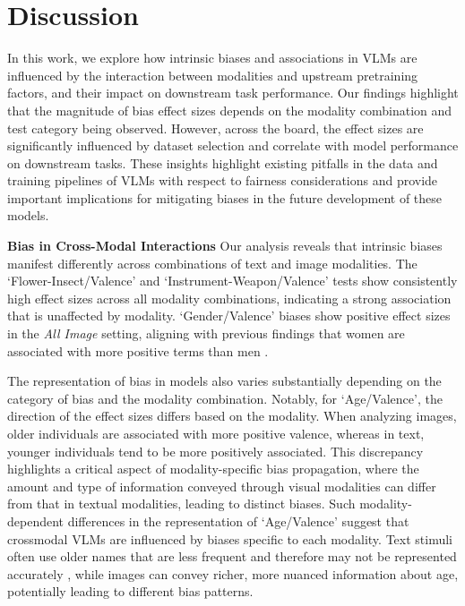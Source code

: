 \section{Discussion}
In this work, we explore how intrinsic biases and associations in VLMs are influenced by the interaction between modalities and upstream pretraining factors, and their impact on downstream task performance. Our findings highlight that the magnitude of bias effect sizes depends on the modality combination and test category being observed. However, across the board, the effect sizes are significantly influenced by dataset selection and correlate with model performance on downstream tasks. These insights highlight existing pitfalls in the data and training pipelines of VLMs with respect to fairness considerations and provide important implications for mitigating biases in the future development of these models.

\noindent\textbf{Bias in Cross-Modal Interactions} Our analysis reveals that intrinsic biases manifest differently across combinations of text and image modalities. The `Flower-Insect/Valence' and `Instrument-Weapon/Valence' tests show consistently high effect sizes across all modality combinations, indicating a strong association that is unaffected by modality. `Gender/Valence' biases show positive effect sizes in the \textit{All Image} setting, aligning with previous findings that women are associated with more positive terms than men \cite{caliskan2022gender, charlesworth2024extracting}. 

The representation of bias in models also varies substantially depending on the category of bias and the modality combination. Notably, for `Age/Valence', the direction of the effect sizes differs based on the modality. When analyzing images, older individuals are associated with more positive valence, whereas in text, younger individuals tend to be more positively associated. This discrepancy highlights a critical aspect of modality-specific bias propagation, where the amount and type of information conveyed through visual modalities can differ from that in textual modalities, leading to distinct biases. Such modality-dependent differences in the representation of `Age/Valence' suggest that crossmodal VLMs are influenced by biases specific to each modality. Text stimuli often use older names that are less frequent and therefore may not be represented accurately \cite{wilson2024gender}, while images can convey richer, more nuanced information about age, potentially leading to different bias patterns.


